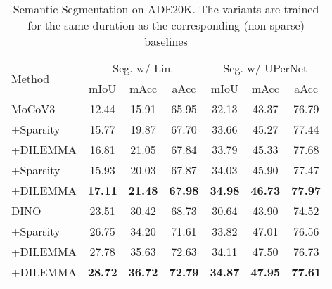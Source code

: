 \documentclass[letterpaper]{article} \usepackage{aaai23}  \usepackage{times}  \usepackage{helvet}  \usepackage{courier}  \usepackage[hyphens]{url}  \usepackage{graphicx} \urlstyle{rm} \def\UrlFont{\rm}  \usepackage{natbib}  \usepackage{caption} \frenchspacing  \setlength{\pdfpagewidth}{8.5in}  \setlength{\pdfpageheight}{11in}  \usepackage{algorithm}
\newcommand{\methodname}{DILEMMA}
\begin{document}
\begin{table}[t]
    \centering
    \small
    \centering
    \setlength{\tabcolsep}{4.0pt}
        \begin{tabular}{@{}lcccccc@{}}
        \toprule  
        \multirow{2}{*}{Method} & \multicolumn{3}{c}{Seg. w/ Lin.} & \multicolumn{3}{c}{Seg. w/ UPerNet} \\
        \cmidrule(lr){2-4}\cmidrule(lr){5-7}
    & mIoU & mAcc & aAcc & mIoU & mAcc & aAcc \\
    \toprule
MoCoV3 & 12.44 & 15.91 & 65.95 & 32.13 & 43.37 & 76.79 \\
+Sparsity & 15.77 & 19.87 & 67.70 & 33.66 & 45.27 & 77.44 \\
+\methodname & 16.81 & 21.05 & 67.84 & 33.79 & 45.33 & 77.68 \\
+Sparsity & 15.93 & 20.03 & 67.87 & 34.03 & 45.90 & 77.47 \\
+\methodname & \bf 17.11 & \bf 21.48 & \bf 67.98 & \bf 34.98 & \bf 46.73 & \bf 77.97 \\
\midrule
DINO & 23.51 & 30.42 & 68.73 & 30.64 & 43.90 & 74.52 \\
+Sparsity & 26.75 & 34.20 & 71.61 & 33.82 & 47.01 & 76.56 \\
+\methodname & 27.78 & 35.63 & 72.63 & 34.11 & 47.50 & 76.73 \\
+\methodname & \bf 28.72 & \bf 36.72 & \bf 72.79 & \bf 34.87 & \bf 47.95 & \bf 77.61 \\
        \bottomrule
        \end{tabular}
    \caption{Semantic Segmentation on ADE20K. The  variants are trained for the same duration as the corresponding (non-sparse) baselines}
    \label{tab:semantic_segmentation}
\end{table}
\end{document}
